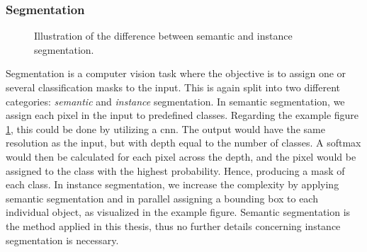     
\subsubsection{Segmentation}
    \begin{figure}[H]
        \centering
        
        \caption[Difference between semantic and instance segmentation]{Illustration of the difference between semantic and instance segmentation.}
      	\medskip 
        \label{segmentation_fig}
    \end{figure}

    Segmentation is a computer vision task where the objective is to assign one or several classification masks to the input\cite{He_2017_ICCV_segmentation}. This is again split into two different categories: \textit{semantic} and \textit{instance} segmentation. In semantic segmentation, we assign each pixel in the input to predefined classes. Regarding the example figure \ref{segmentation_fig}, this could be done by utilizing a \gls{cnn}. The output would have the same resolution as  the input, but with depth equal to the number of classes. A softmax would then be calculated for each pixel across the depth, and the pixel would be assigned to the class with the highest probability. Hence, producing a mask of each class. In instance segmentation, we increase the complexity by applying semantic segmentation and in parallel assigning a bounding box to each individual object, as visualized in the example figure. Semantic segmentation is the method applied in this thesis, thus no further details concerning instance segmentation is necessary.
    

    


        

    
    